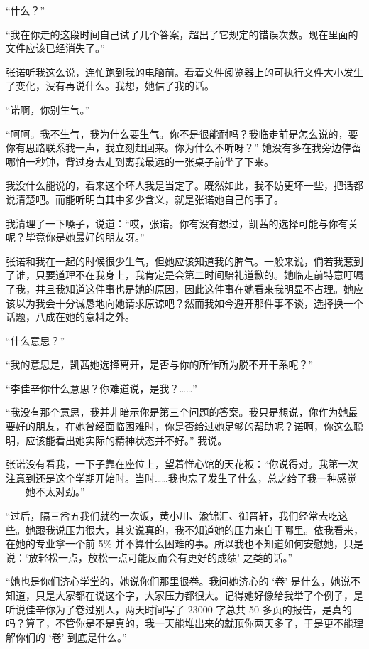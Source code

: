 \documentclass[UTF8]{ctexart}
\begin{document}
“什么？”

“我在你走的这段时间自己试了几个答案，超出了它规定的错误次数。现在里面的文件应该已经消失了。”

张诺听我这么说，连忙跑到我的电脑前。看着文件阅览器上的可执行文件大小发生了变化，没有再说什么。我想，她信了我的话。

“诺啊，你别生气。”

“呵呵。我不生气，我为什么要生气。你不是很能耐吗？我临走前是怎么说的，要你有思路联系我一声，我立刻赶回来。你为什么不听呀？” 她没有多在我旁边停留哪怕一秒钟，背过身去走到离我最远的一张桌子前坐了下来。

我没什么能说的，看来这个坏人我是当定了。既然如此，我不妨更坏一些，把话都说清楚吧。而能听明白其中多少含义，就是张诺她自己的事了。

我清理了一下嗓子，说道：“哎，张诺。你有没有想过，凯茜的选择可能与你有关呢？毕竟你是她最好的朋友呀。”

张诺和我在一起的时候很少生气，但她应该知道我的脾气。一般来说，倘若我惹到了谁，只要道理不在我身上，我肯定是会第二时间赔礼道歉的。她临走前特意叮嘱了我，并且我知道这件事也是她的原因，因此这件事在她看来我明显不占理。她应该以为我会十分诚恳地向她请求原谅吧？然而我如今避开那件事不谈，选择换一个话题，八成在她的意料之外。

“什么意思？”

“我的意思是，凯茜她选择离开，是否与你的所作所为脱不开干系呢？”

“李佳辛你什么意思？你难道说，是我？……”

“我没有那个意思，我并非暗示你是第三个问题的答案。我只是想说，你作为她最要好的朋友，在她曾经面临困难时，你是否给过她足够的帮助呢？诺啊，你这么聪明，应该能看出她实际的精神状态并不好。” 我说。

张诺没有看我，一下子靠在座位上，望着惟心馆的天花板：“你说得对。我第一次注意到还是这个学期开始时。当时……我也忘了发生了什么，总之给了我一种感觉——她不太对劲。”

“过后，隔三岔五我们就约一次饭，黄小川、渝锦汇、御晋轩，我们经常去吃这些。她跟我说压力很大，其实说真的，我不知道她的压力来自于哪里。依我看来，在她的专业拿一个前 5\% 并不算什么困难的事。所以我也不知道如何安慰她，只是说：‘放轻松一点，放松一点可能反而会有更好的成绩’ 之类的话。”

“她也是你们济心学堂的，她说你们那里很卷。我问她济心的 ‘卷’ 是什么，她说不知道，只是大家都在说这个字，大家压力都很大。记得她好像给我举了个例子，是听说佳辛你为了卷过别人，两天时间写了 23000 字总共 50 多页的报告，是真的吗？算了，不管你是不是真的，我一天能堆出来的就顶你两天多了，于是更不能理解你们的 ‘卷’ 到底是什么。”
\end{document}
